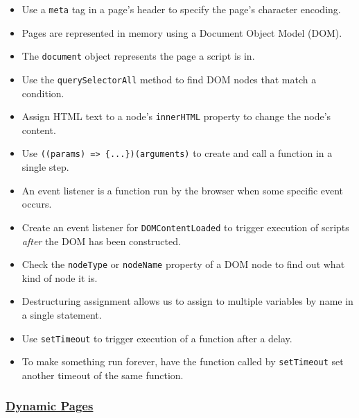 \begin{itemize}
\tightlist
\item
  Use a \texttt{meta} tag in a page's header to specify the page's
  character encoding.
\item
  Pages are represented in memory using a Document Object Model (DOM).
\item
  The \texttt{document} object represents the page a script is in.
\item
  Use the \texttt{querySelectorAll} method to find DOM nodes that match
  a condition.
\item
  Assign HTML text to a node's \texttt{innerHTML} property to change the
  node's content.
\item
  Use \texttt{((params)\ =\textgreater{}\ \{...\})(arguments)} to create
  and call a function in a single step.
\item
  An event listener is a function run by the browser when some specific
  event occurs.
\item
  Create an event listener for
  \texttt{\textquotesingle{}DOMContentLoaded\textquotesingle{}} to
  trigger execution of scripts \emph{after} the DOM has been
  constructed.
\item
  Check the \texttt{nodeType} or \texttt{nodeName} property of a DOM
  node to find out what kind of node it is.
\item
  Destructuring assignment allows us to assign to multiple variables by
  name in a single statement.
\item
  Use \texttt{setTimeout} to trigger execution of a function after a
  delay.
\item
  To make something run forever, have the function called by
  \texttt{setTimeout} set another timeout of the same function.
\end{itemize}

\subsubsection{\texorpdfstring{\protect\hyperlink{s:dynamic}{Dynamic
Pages}}{Dynamic Pages}}\label{null}

